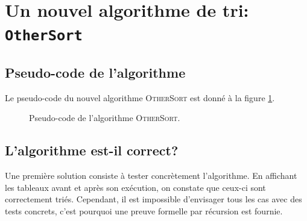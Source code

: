 \documentclass[a4paper, 12pt]{article}
\begin{document}
	\section{Un nouvel algorithme de tri: \texttt{OtherSort}}
	\subsection{Pseudo-code de l'algorithme}
	Le pseudo-code du nouvel algorithme \textsc{OtherSort} est donné à la figure \ref{fig:pseudo_code_other_sort}.
	\begin{figure}[!h]
		\centering
		\setlength{\fboxsep}{3mm}
		\setlength{\fboxrule}{1.5pt}
		\caption{Pseudo-code de l'algorithme \textsc{OtherSort}.}
		\label{fig:pseudo_code_other_sort}
	\end{figure}
	\subsection{L'algorithme est-il correct?}
	Une première solution consiste à tester concrètement l'algorithme. En affichant les tableaux avant et après son exécution, on constate que ceux-ci sont correctement triés. Cependant, il est impossible d'envisager tous les cas avec des tests concrets, c'est pourquoi une preuve formelle par récursion est fournie.\par
	
\end{document}
